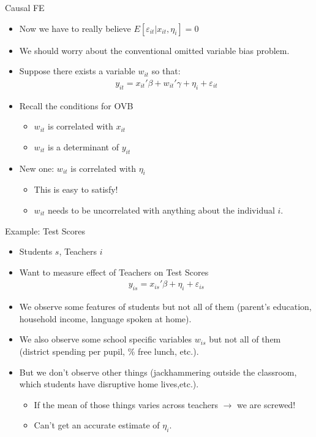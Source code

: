 \documentclass[xcolor=pdftex,dvipsnames,table,mathserif,aspectratio=169]{beamer}
\begin{document}
\begin{frame}{Causal FE}
\begin{itemize}
\item Now we have to really believe $E[ \varepsilon_{it} | x_{it}, \eta_i]=0$
\item We should worry about the conventional \alert{omitted variable bias} problem.
\item Suppose there exists a variable $w_{it}$ so that:
\begin{eqnarray*}
y_{it} =  x_{it}'\beta +  w_{it}'\gamma + \eta_i + \varepsilon_{it}
\end{eqnarray*}
\item Recall the conditions for OVB
\begin{itemize}
\item $w_{it}$ is correlated with $x_{it}$
\item $w_{it}$ is a determinant of $y_{it}$
\end{itemize}
\item New one:  $w_{it}$ is correlated with $\eta_i$
\begin{itemize}
\item This is easy to satisfy!
\item $w_{it}$ needs to be uncorrelated with anything about the individual $i$.
\end{itemize}
\end{itemize}
\end{frame}



\begin{frame}{Example: Test Scores}
\begin{itemize}
\item Students $s$, Teachers $i$
\item Want to measure effect of \alert{Teachers} on \alert{Test Scores}
\begin{eqnarray*}
y_{is} = x_{is}' \beta  + \eta_i + \varepsilon_{is}
\end{eqnarray*}
\item We observe some features of students but not all of them (parent's education, household income, language spoken at home).
\item We also observe some school specific variables $w_{is}$ but not all of them (district spending per pupil, \% free lunch, etc.).
\item But we don't observe other things (jackhammering outside the classroom, which students have disruptive home lives,etc.).
\begin{itemize}
\item If the mean of those things varies across teachers $\rightarrow$ we are screwed!
\item Can't get an accurate estimate of $\eta_i$.
\end{itemize}
\end{itemize}
\end{frame}
\end{document}
